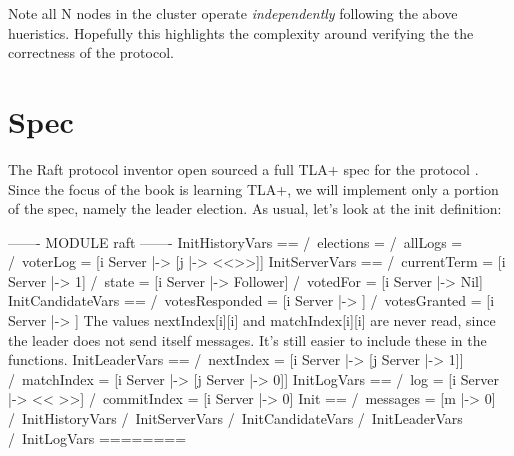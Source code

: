 \documentclass{report}
\begin{document}
Note all N nodes in the cluster operate \textit{independently} following the
above hueristics. Hopefully this highlights the complexity around verifying the 
the correctness of the protocol.

\section{Spec}

The Raft protocol inventor open sourced a full TLA+ spec for the protocol
\cite{raft_tla}. Since the focus of the book is learning TLA+, we will implement
only a portion of the spec, namely the leader election. As usual, let's look at the 
init definition:\newline

\begin{tla}
------- MODULE raft ------- 
InitHistoryVars == /\ elections = {}
                   /\ allLogs   = {}
                   /\ voterLog  = [i \in Server |-> [j \in {} |-> <<>>]]
InitServerVars == /\ currentTerm = [i \in Server |-> 1]
                  /\ state       = [i \in Server |-> Follower]
                  /\ votedFor    = [i \in Server |-> Nil]
InitCandidateVars == /\ votesResponded = [i \in Server |-> {}]
                     /\ votesGranted   = [i \in Server |-> {}]
\* The values nextIndex[i][i] and matchIndex[i][i] are never read, since the
\* leader does not send itself messages. It's still easier to include these
\* in the functions.
InitLeaderVars == /\ nextIndex  = [i \in Server |-> [j \in Server |-> 1]]
                  /\ matchIndex = [i \in Server |-> [j \in Server |-> 0]]
InitLogVars == /\ log          = [i \in Server |-> << >>]
               /\ commitIndex  = [i \in Server |-> 0]
Init == /\ messages = [m \in {} |-> 0]
        /\ InitHistoryVars
        /\ InitServerVars
        /\ InitCandidateVars
        /\ InitLeaderVars
        /\ InitLogVars
========
\end{tla}
\end{document}
